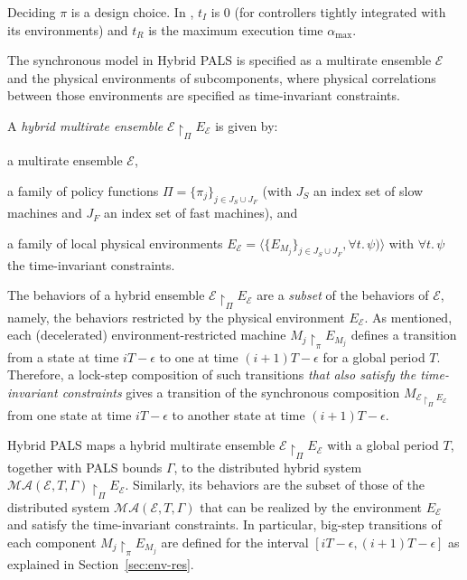 Deciding $\pi$ is a design choice. 
In %
\cite{hybrid-pals}, $t_I$ is $0$ 
(for controllers tightly integrated with its environments)
and $t_R$ is  
the maximum execution time $\alpha_{\max}$.


The synchronous model in Hybrid PALS is specified
as a multirate ensemble $\mathcal{E}$ and  the physical environments of subcomponents,
where physical correlations between those environments
are specified as time-invariant constraints.

\begin{definition}
A \emph{hybrid multirate ensemble} $\mathcal{E}\restriction_{\Pi} E_{\mathcal{E}}$
is given by:
\begin{inparaenum}[(i)]
    \item a multirate ensemble $\mathcal{E}$, %
    \item a family of policy functions $\Pi=\{\pi_j\}_{j\in J_S  \cup J_F}$
    (with $J_S$ an index set of slow machines and $J_F$ an index set of fast machines),
    and
    \item a family of local physical environments 
    $E_\mathcal{E} = \langle\{E_{M_j}\}_{j\in J_S \cup J_F}, \forall t.\, \psi)\rangle$ 
    with $\forall t.\,\psi$ the time-invariant constraints.
\end{inparaenum}
\end{definition}   


The behaviors of a hybrid ensemble  $\mathcal{E} \restriction_{\Pi} E_\mathcal{E}$
are  a \emph{subset} of the behaviors of $\mathcal{E}$, namely, the behaviors restricted by 
the physical environment $E_\mathcal{E}$.
As mentioned,
each (decelerated) environment-restricted machine $M_j \restriction_\pi E_{M_j}$ defines 
a transition from a state  at time $iT - \epsilon$ to one at time $(i+1)T-\epsilon$ for a global period $T$.
Therefore, a lock-step composition of such %
transitions
\emph{that also satisfy the time-invariant constraints} gives a transition of 
the synchronous composition $M_{\mathcal{E} \restriction_{\Pi} E_\mathcal{E}}$
from one state at time $iT - \epsilon$ to another state at time $(i+1)T-\epsilon$.


Hybrid PALS maps a hybrid multirate ensemble
$\mathcal{E}\restriction_{\Pi} E_\mathcal{E}$ with a global period $T$, 
together with PALS bounds $\Gamma$,  to the distributed hybrid system  
$\mathcal{MA}(\mathcal{E}, T, \Gamma) \restriction_{\Pi} E_\mathcal{E}$.
Similarly, its  behaviors are the subset of those of the %
distributed system $\mathcal{MA}(\mathcal{E}, T, \Gamma)$ that can be realized
by the %
environment $E_\mathcal{E}$
and satisfy the time-invariant constraints.
In particular, big-step transitions of each component $M_j \restriction_\pi E_{M_j}$ are
defined for the interval $[iT - \epsilon, (i+1)T-\epsilon]$
 as explained in Section~\ref{sec:env-res}.


